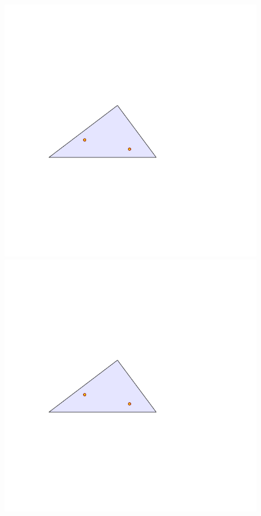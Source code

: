 \documentclass[12pt]{article}%
\begin{document}
\begin{figure}[h]
    \includegraphics[page=1]{figs/narrow_triangle} \hfill
    \includegraphics[page=2]{figs/narrow_triangle} \hfill

\end{figure}
\end{document}
